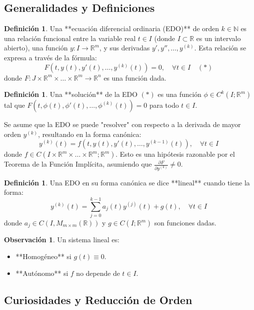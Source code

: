 \documentclass[11pt]{article}
\theoremstyle{definition} %
\newtheorem{definition}[theorem]{Definición}
\newtheorem{remark}[theorem]{Observación}
\begin{document}
\subsection{Generalidades y Definiciones}
\begin{definition}
Una **ecuación diferencial ordinaria (EDO)** de orden $k \in \mathbb{N}$ es una relación funcional entre la variable real $t \in I$ (donde $I \subset \mathbb{R}$ es un intervalo abierto), una función $y: I \rightarrow \mathbb{R}^m$, y sus derivadas $y', y'', \dots, y^{(k)}$. Esta relación se expresa a través de la fórmula:
$$F(t, y(t), y'(t), \dots, y^{(k)}(t)) = 0, \quad \forall t \in I \quad (*)$$
donde $F: J \times \mathbb{R}^m \times \dots \times \mathbb{R}^m \rightarrow \mathbb{R}^n$ es una función dada.
\end{definition}

\begin{definition}
Una **solución** de la EDO $(*)$ es una función $\phi \in C^k(I; \mathbb{R}^m)$ tal que $F(t, \phi(t), \phi'(t), \dots, \phi^{(k)}(t)) = 0$ para todo $t \in I$.
\end{definition}

Se asume que la EDO se puede "resolver" con respecto a la derivada de mayor orden $y^{(k)}$, resultando en la forma canónica:
$$y^{(k)}(t) = f(t, y(t), y'(t), \dots, y^{(k-1)}(t)), \quad \forall t \in I$$
donde $f \in C(I \times \mathbb{R}^m \times \dots \times \mathbb{R}^m; \mathbb{R}^m)$. Esto es una hipótesis razonable por el Teorema de la Función Implícita, asumiendo que $\frac{\partial F}{\partial y^{(k)}} \ne 0$.

\begin{definition}
Una EDO en su forma canónica se dice **lineal** cuando tiene la forma:
$$y^{(k)}(t) = \sum_{j=0}^{k-1} a_j(t) y^{(j)}(t) + g(t), \quad \forall t \in I$$
donde $a_j \in C(I, M_{m \times m}(\mathbb{R}))$ y $g \in C(I; \mathbb{R}^m)$ son funciones dadas.
\end{definition}

\begin{remark}
Un sistema lineal es:
\begin{itemize}
    \item **Homogéneo** si $g(t) \equiv 0$.
    \item **Autónomo** si $f$ no depende de $t \in I$.
\end{itemize}
\end{remark}

\subsection{Curiosidades y Reducción de Orden}
\label{sec:curiosidades}
\end{document}
